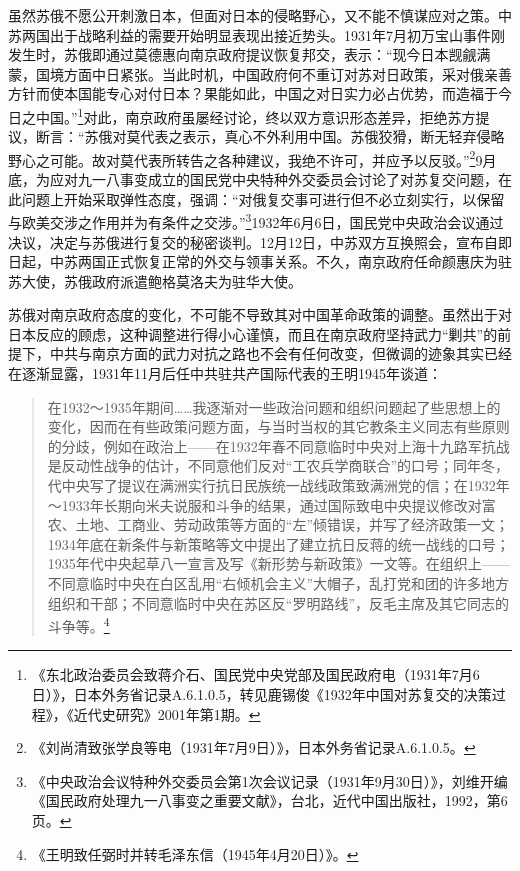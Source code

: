 虽然苏俄不愿公开刺激日本，但面对日本的侵略野心，又不能不慎谋应对之策。中苏两国出于战略利益的需要开始明显表现出接近势头。1931年7月初万宝山事件刚发生时，苏俄即通过莫德惠向南京政府提议恢复邦交，表示：“现今日本觊觎满蒙，国境方面中日紧张。当此时机，中国政府何不重订对苏对日政策，采对俄亲善方针而使本国能专心对付日本？果能如此，中国之对日实力必占优势，而造福于今日之中国。”\footnote{《东北政治委员会致蒋介石、国民党中央党部及国民政府电（1931年7月6日）》，日本外务省记录A.6.1.0.5，转见鹿锡俊《1932年中国对苏复交的决策过程》，《近代史研究》2001年第1期。}对此，南京政府虽屡经讨论，终以双方意识形态差异，拒绝苏方提议，断言：“苏俄对莫代表之表示，真心不外利用中国。苏俄狡猾，断无轻弃侵略野心之可能。故对莫代表所转告之各种建议，我绝不许可，并应予以反驳。”\footnote{《刘尚清致张学良等电（1931年7月9日）》，日本外务省记录A.6.1.0.5。}9月底，为应对九一八事变成立的国民党中央特种外交委员会讨论了对苏复交问题，在此问题上开始采取弹性态度，强调：“对俄复交事可进行但不必立刻实行，以保留与欧美交涉之作用并为有条件之交涉。”\footnote{《中央政治会议特种外交委员会第1次会议记录（1931年9月30日）》，刘维开编《国民政府处理九一八事变之重要文献》，台北，近代中国出版社，1992，第6页。}1932年6月6日，国民党中央政治会议通过决议，决定与苏俄进行复交的秘密谈判。12月12日，中苏双方互换照会，宣布自即日起，中苏两国正式恢复正常的外交与领事关系。不久，南京政府任命颜惠庆为驻苏大使，苏俄政府派遣鲍格莫洛夫为驻华大使。


苏俄对南京政府态度的变化，不可能不导致其对中国革命政策的调整。虽然出于对日本反应的顾虑，这种调整进行得小心谨慎，而且在南京政府坚持武力“剿共”的前提下，中共与南京方面的武力对抗之路也不会有任何改变，但微调的迹象其实已经在逐渐显露，1931年11月后任中共驻共产国际代表的王明1945年谈道：

\begin{quote}

在1932～1935年期间……我逐渐对一些政治问题和组织问题起了些思想上的变化，因而在有些政策问题方面，与当时当权的其它教条主义同志有些原则的分歧，例如在政治上——在1932年春不同意临时中央对上海十九路军抗战是反动性战争的估计，不同意他们反对“工农兵学商联合”的口号；同年冬，代中央写了提议在满洲实行抗日民族统一战线政策致满洲党的信；在1932年～1933年长期向米夫说服和斗争的结果，通过国际致电中央提议修改对富农、土地、工商业、劳动政策等方面的“左”倾错误，并写了经济政策一文；1934年底在新条件与新策略等文中提出了建立抗日反蒋的统一战线的口号；1935年代中央起草八一宣言及写《新形势与新政策》一文等。在组织上——不同意临时中央在白区乱用“右倾机会主义”大帽子，乱打党和团的许多地方组织和干部；不同意临时中央在苏区反“罗明路线”，反毛主席及其它同志的斗争等。\footnote{《王明致任弼时并转毛泽东信（1945年4月20日）》。}
\end{quote}



